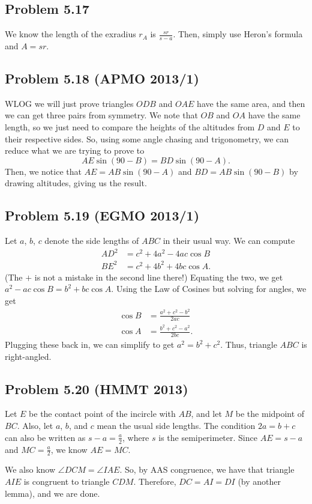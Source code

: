 \documentclass{scrartcl}
\begin{document}
\subsection*{Problem 5.17}
We know the length of the exradius $r_A$ is $\frac{sr}{s-a}$. Then, simply use Heron's formula and $A = sr$.
\subsection*{Problem 5.18 (APMO 2013/1)}
WLOG we will just prove triangles $ODB$ and $OAE$ have the same area, and then we can get three pairs from symmetry. We note that $OB$ and $OA$ have the same length, so we just need to compare the heights of the altitudes from $D$ and $E$ to their respective sides. So, using some angle chasing and trigonometry, we can reduce what we are trying to prove to
\[
    AE \sin (90 - B) = BD \sin (90 - A).
\]
Then, we notice that $AE = AB \sin (90 - A)$ and $BD = AB \sin (90 - B)$ by drawing altitudes, giving us the result.
\subsection*{Problem 5.19 (EGMO 2013/1)}
Let $a$, $b$, $c$ denote the side lengths of $ABC$ in their usual way. We can compute
\begin{align*}
    AD^2 &= c^2 + 4a^2 - 4ac \cos B \\
    BE^2 &= c^2 + 4b^2 + 4bc \cos A.
\end{align*}
(The $+$ is not a mistake in the second line there!) Equating the two, we get $a^2 - ac \cos B = b^2 + bc \cos A$. Using the Law of Cosines but solving for angles, we get
\begin{align*}
    \cos B &= \frac{a^2 + c^2 - b^2}{2ac} \\
    \cos A &= \frac{b^2 + c^2 - a^2}{2bc}.
\end{align*}
Plugging these back in, we can simplify to get $a^2 = b^2 + c^2$. Thus, triangle $ABC$ is right-angled.
\subsection*{Problem 5.20 (HMMT 2013)}
Let $E$ be the contact point of the incircle with $AB$, and let $M$ be the midpoint of $BC$.
Also, let $a$, $b$, and $c$ mean the usual side lengths. The condition $2a = b + c$ can also be written as $s - a = \frac{a}{2}$, where $s$ is the semiperimeter. Since $AE = s - a$ and $MC = \frac{a}{2}$, we know $AE = MC$.

We also know $\angle DCM = \angle IAE$. So, by AAS congruence, we have that triangle $AIE$ is congruent to triangle $CDM$. Therefore, $DC = AI = DI$ (by another lemma), and we are done.
\end{document}
